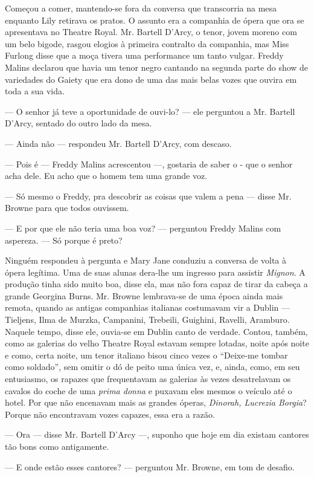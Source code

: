 Começou a comer, mantendo-se fora da conversa que transcorria na
mesa enquanto Lily retirava os pratos. O assunto era a companhia de
ópera que ora se apresentava no Theatre Royal. Mr. Bartell D'Arcy, o
tenor, jovem moreno com um belo bigode, rasgou elogios à primeira
contralto da companhia, mas Miss Furlong disse que a moça tivera uma
performance um tanto vulgar. Freddy Malins declarou que havia um tenor
negro cantando na segunda parte do show de variedades do Gaiety que
era dono de uma das mais belas vozes que ouvira em toda a sua vida.

--- O senhor já teve a oportunidade de ouvi-lo? --- ele perguntou a
Mr. Bartell D'Arcy, sentado do outro lado da mesa.

--- Ainda não --- respondeu Mr. Bartell D'Arcy, com descaso.

--- Pois é --- Freddy Malins acrescentou ---, gostaria de saber o -
que o senhor acha dele. Eu acho que o homem tem uma grande voz.

--- Só mesmo o Freddy, pra descobrir as coisas que valem a pena ---
disse Mr. Browne para que todos ouvissem.

--- E por que ele não teria uma boa voz? --- perguntou Freddy Malins
com aspereza. --- Só porque é preto?

Ninguém respondeu à pergunta e Mary Jane conduziu a conversa de
volta à ópera legítima. Uma de suas alunas dera-lhe um ingresso para
assistir \textit{Mignon}. A produção tinha sido muito boa, disse ela, mas não
fora capaz de tirar da cabeça a grande Georgina Burns. Mr. Browne
lembrava-se de uma época ainda mais remota, quando as antigas
companhias italianas costumavam vir a Dublin 
--- Tieljens, Ilma de Murzka, Campanini, Trebeili, Guighini, Ravelli,
Aramburo. Naquele tempo, disse ele, ouvia-se em Dublin canto de
verdade. Contou, também, como as galerias do velho Theatre Royal
estavam sempre lotadas, noite após noite e como, certa noite, um tenor
italiano bisou cinco vezes o ``Deixe-me tombar como soldado'', sem
omitir o dó de peito uma única vez, e, ainda, como, em seu entusiasmo,
os rapazes que frequentavam as galerias às vezes desatrelavam os
cavalos do coche de uma \textit{prima donna} e puxavam eles mesmos o veículo
até o hotel. Por que não encenavam mais as grandes óperas, \textit{Dinorah,
Lucrezia Borgia}? Porque não encontravam vozes capazes, essa era a
razão.

--- Ora --- disse Mr. Bartell D'Arcy ---, suponho que hoje em dia
existam cantores tão bons como antigamente.

--- E onde estão esses cantores? --- perguntou Mr. Browne, em tom de
desafio.

